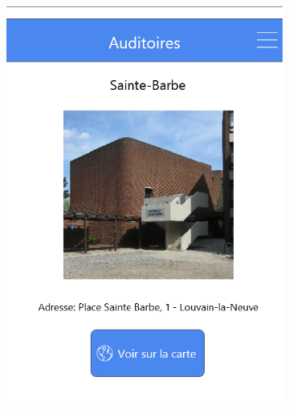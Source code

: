 \documentclass{eplmastersthesis}
\begin{document}
\begin{figure}[H]
\begin{subfigure}[b]{0.3\textwidth}
        \includegraphics[width=\textwidth]{Images/InVision/auditoiredetail.png}
    \end{subfigure}
    ~ %
    \begin{subfigure}[b]{0.3\textwidth}

\end{subfigure}
\end{figure}
\end{document}
